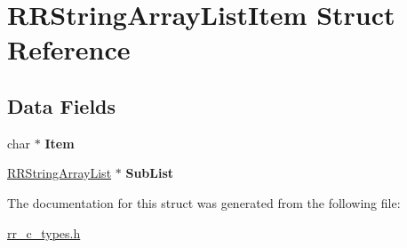\hypertarget{struct_r_r_string_array_list_item}{
\section{\-R\-R\-String\-Array\-List\-Item \-Struct \-Reference}
\label{struct_r_r_string_array_list_item}
}
\subsection*{\-Data \-Fields}
\begin{DoxyCompactItemize}
\item 
\hypertarget{struct_r_r_string_array_list_item_a244b3f4d5a24f0cae10de599fe62c889}{
char $\ast$ {\bfseries \-Item}}
\label{struct_r_r_string_array_list_item_a244b3f4d5a24f0cae10de599fe62c889}

\item 
\hypertarget{struct_r_r_string_array_list_item_a933c5818b994da50f225a40b967fb661}{
\hyperlink{struct_r_r_string_array_list}{\-R\-R\-String\-Array\-List} $\ast$ {\bfseries \-Sub\-List}}
\label{struct_r_r_string_array_list_item_a933c5818b994da50f225a40b967fb661}

\end{DoxyCompactItemize}


\-The documentation for this struct was generated from the following file\-:\begin{DoxyCompactItemize}
\item 
\hyperlink{rr__c__types_8h}{rr\-\_\-c\-\_\-types.\-h}\end{DoxyCompactItemize}
